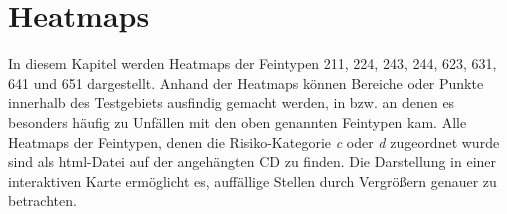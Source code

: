
\chapter{Heatmaps}\label{chapter:Heatmaps}

In diesem Kapitel werden Heatmaps der Feintypen 211, 224, 243, 244, 623, 631, 641 und 651 dargestellt. Anhand der Heatmaps können Bereiche oder Punkte innerhalb des Testgebiets ausfindig gemacht werden, in bzw. an denen es besonders häufig zu Unfällen mit den oben genannten Feintypen kam. Alle Heatmaps der Feintypen, denen die Risiko-Kategorie \textit{c} oder \textit{d} zugeordnet wurde sind als html-Datei auf der angehängten CD zu finden. Die Darstellung in einer interaktiven Karte ermöglicht es, auffällige Stellen durch Vergrößern genauer zu betrachten.

